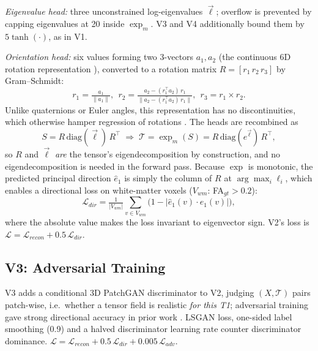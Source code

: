 \documentclass[conference,compsoc]{IEEEtran}
\begin{document}
\textit{Eigenvalue head:} three unconstrained log-eigenvalues $\vec\ell$; overflow is prevented by capping eigenvalues at 20 inside $\exp_m$. V3 and V4 additionally bound them by $5\tanh(\cdot)$, as in V1.

\textit{Orientation head:} six values forming two 3-vectors $a_1,a_2$ (the continuous 6D rotation representation \cite{zhou2019continuity}), converted to a rotation matrix $R=[r_1\,r_2\,r_3]$ by Gram--Schmidt:
\begin{equation}
r_1=\tfrac{a_1}{\|a_1\|},\ \ r_2=\tfrac{a_2-(r_1^{\top}a_2)\,r_1}{\|a_2-(r_1^{\top}a_2)\,r_1\|},\ \ r_3=r_1\times r_2 .
\end{equation}
Unlike quaternions or Euler angles, this representation has no discontinuities, which otherwise hamper regression of rotations \cite{zhou2019continuity}. The heads are recombined as
\begin{equation}
S=R\,\mathrm{diag}(\vec\ell)\,R^\top \;\Rightarrow\; \mathcal{T}=\exp_m(S)=R\,\mathrm{diag}(e^{\vec\ell})\,R^\top ,
\end{equation}
so $R$ and $\vec\ell$ \emph{are} the tensor's eigendecomposition by construction, and no eigendecomposition is needed in the forward pass. Because $\exp$ is monotonic, the predicted principal direction $\hat e_1$ is simply the column of $R$ at $\arg\max_i \ell_i$, which enables a directional loss on white-matter voxels ($V_{wm}$: FA$_{gt}>0.2$):
\begin{equation}
\mathcal{L}_{dir}=\tfrac{1}{|V_{wm}|}\textstyle\sum_{v\in V_{wm}}\big(1-|\hat e_1(v)\cdot e_1(v)|\big),
\end{equation}
where the absolute value makes the loss invariant to eigenvector sign. V2's loss is $\mathcal{L}=\mathcal{L}_{recon}+0.5\,\mathcal{L}_{dir}$.

\subsection{V3: Adversarial Training}
V3 adds a conditional 3D PatchGAN discriminator \cite{isola2017pix2pix} to V2, judging $(X,\mathcal{T})$ pairs patch-wise, i.e.\ whether a tensor field is realistic \emph{for this T1}; adversarial training gave strong directional accuracy in prior work \cite{paper1}. LSGAN loss, one-sided label smoothing (0.9) and a halved discriminator learning rate counter discriminator dominance. $\mathcal{L}=\mathcal{L}_{recon}+0.5\,\mathcal{L}_{dir}+0.005\,\mathcal{L}_{adv}$.
\end{document}
